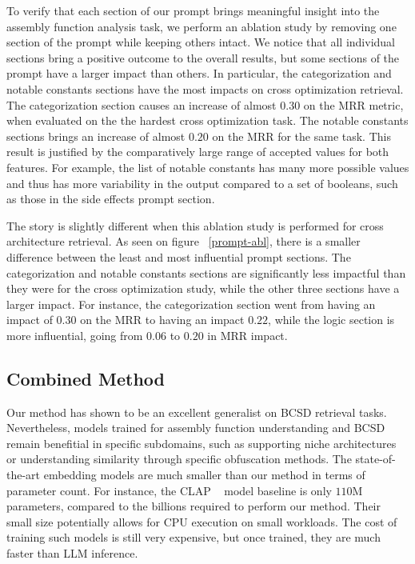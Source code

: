 To verify that each section of our prompt brings meaningful insight into the assembly function analysis task, we perform an ablation
study by removing one section of the prompt while keeping others intact. We notice that all individual sections bring a positive
outcome to the overall results, but some sections of the prompt have a larger impact than others. In particular, the categorization and
notable constants sections have the most impacts on cross optimization retrieval. The categorization section causes an increase of almost
\(0.30\) on the MRR metric, when evaluated on the the hardest cross optimization task. The notable constants sections brings an increase of
almost \(0.20\) on the MRR for the same task. This result is justified by the comparatively large range of accepted values for both features.
For example, the list of notable constants has many more possible values and thus has more variability in the output compared to a set
of booleans, such as those in the side effects prompt section.

The story is slightly different when this ablation study is performed for cross architecture retrieval. As seen on figure ~\ref{prompt-abl},
there is a smaller difference between the least and most influential prompt sections. The categorization and notable constants sections
are significantly less impactful than they were for the cross optimization study, while the other three sections have a larger impact.
For instance, the categorization section went from having an impact of \(0.30\) on the MRR to having an impact \(0.22\), while the logic
section is more influential, going from \(0.06\) to \(0.20\) in MRR impact.

\subsection{Combined Method}

Our method has shown to be an excellent generalist on BCSD retrieval tasks. Nevertheless, models trained for assembly function understanding
and BCSD remain benefitial in specific subdomains, such as supporting niche architectures or understanding similarity through
specific obfuscation methods. The state-of-the-art embedding models are much smaller than our method in terms of parameter count.
For instance, the CLAP ~\cite{CLAP} model baseline is only \(110\)M parameters, compared to the billions required to perform our method.
Their small size potentially allows for CPU execution on small workloads. The cost of training such models is still very expensive,
but once trained, they are much faster than LLM inference.

